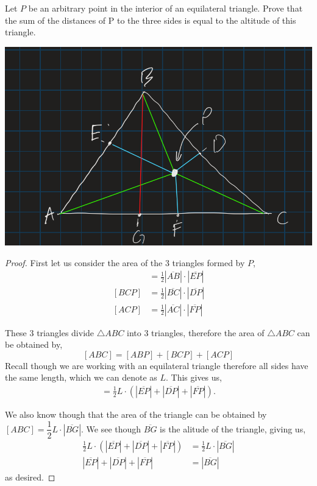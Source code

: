 \documentclass[11pt]{article}
\newenvironment{problem}[2][Problem\!]{\begin{trivlist}
\item[\hskip \labelsep {\bfseries #1}\hskip \labelsep {\bfseries #2}]}{\end{trivlist}}
\newcommand{\abs}[1]{\left\lvert#1\right\rvert} %
\begin{document}
\begin{tcolorbox}
    \begin{problem} {IC | 11/17 | 153.}
       Let $P$ be an arbitrary point in the interior of an equilateral triangle. Prove that the sum of the distances of P to the three sides is equal to the altitude of this triangle.
    \end{problem}
\end{tcolorbox}
\includegraphics[scale= .5]{prob3}
\begin{proof} \newcommand{\leng}[1]{\abs{\overline{#1}}}
    First let us consider the area of the 3 triangles formed by $P$, 
    \begin{align*}
        [ABP] &= \frac{1}{2} \leng{AB} \cdot \leng{EP} \\
        [BCP] &= \frac{1}{2} \leng{BC} \cdot \leng{DP} \\
        [ACP] &= \frac{1}{2} \leng{AC} \cdot \leng{FP}
    \end{align*}

    These 3 triangles divide $\triangle ABC$ into 3 triangles, therefore the area of $\triangle ABC$ can be obtained by,
    \[[ABC] = [ABP] + [BCP] + [ACP]\]
    Recall though we are working with an equilateral triangle therefore all sides have the same length, which we can denote as $L$. This gives us,
    \begin{align*}
        [ABC] = \frac{1}{2} L \cdot (\leng{EP} + \leng{DP} +\leng{FP}).
    \end{align*}

    We also know though that the area of the triangle can be obtained by $[ABC] = \dfrac{1}{2} L \cdot \leng{BG}$. We see though $\overline{BG}$ is the alitude of the triangle, giving us, 
    \begin{align*}
        \frac{1}{2} L \cdot (\leng{EP} + \leng{DP} +\leng{FP}) &= \frac{1}{2} L \cdot \leng{BG} \\
        \leng{EP} + \leng{DP} +\leng{FP} &= \leng{BG}
    \end{align*}
    as desired.
\end{proof}
\end{document}
